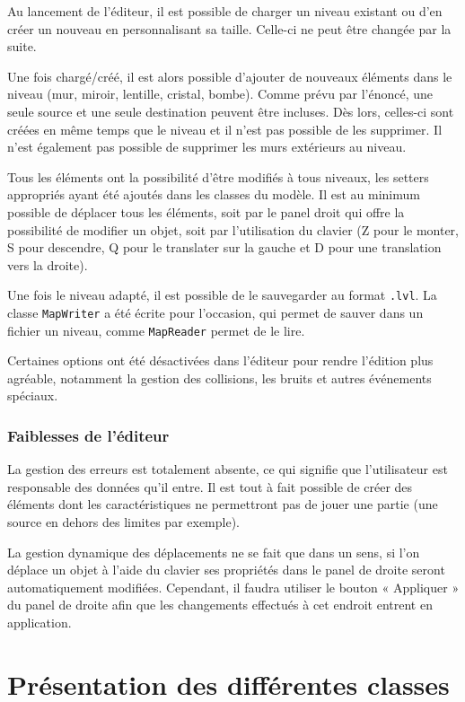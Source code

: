 \documentclass[]{article}
\begin{document}
Au lancement de l’éditeur, il est possible de charger un niveau existant 
ou d’en créer un nouveau en personnalisant sa taille. Celle-ci ne peut 
être changée par la suite.

Une fois chargé/créé, il est alors possible d’ajouter de nouveaux éléments 
dans le niveau (mur, miroir, lentille, cristal, bombe). Comme prévu par l’énoncé,
une seule source et une seule destination peuvent être incluses. Dès lors, 
celles-ci sont créées en même temps que le niveau et il n’est pas possible de 
les supprimer. Il n'est également pas possible de supprimer les murs extérieurs
au niveau.

Tous les éléments ont la possibilité d’être modifiés à tous niveaux, les setters
appropriés ayant été ajoutés dans les classes du modèle. Il est au minimum possible de déplacer
tous les éléments, soit par le panel droit qui offre la possibilité de modifier
un objet, soit par l’utilisation du clavier (Z pour le monter, S pour descendre, Q pour le translater
sur la gauche et D pour une translation vers la droite).

Une fois le niveau adapté, il est possible de le sauvegarder au format \texttt{.lvl}. 
La classe \texttt{MapWriter} a été écrite pour l’occasion, qui permet de sauver 
dans un fichier un niveau, comme \texttt{MapReader} permet de le lire.

Certaines options ont été désactivées dans l’éditeur pour rendre l’édition plus agréable,
notamment la gestion des collisions, les bruits et autres événements spéciaux.

\subsubsection{Faiblesses de l’éditeur}

La gestion des erreurs est totalement absente, ce qui signifie que l’utilisateur est 
responsable des données qu’il entre. Il est tout à fait possible de créer des éléments
dont les caractéristiques ne permettront pas de jouer une partie (une source en dehors
des limites par exemple).

La gestion dynamique des déplacements ne se fait que dans un sens, si l’on déplace un objet
à l’aide du clavier ses propriétés dans le panel de droite seront automatiquement modifiées.
Cependant, il faudra utiliser le bouton « Appliquer » du panel de droite afin que les changements
effectués à cet endroit entrent en application.


\newpage
\section{Présentation des différentes classes}
\end{document}
